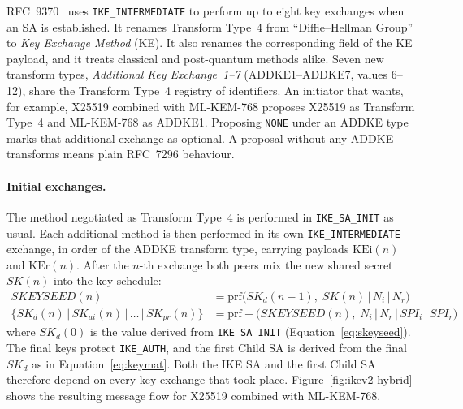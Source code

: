 RFC~9370~\cite{rfc9370} uses \texttt{IKE\_INTERMEDIATE} to perform up to
eight key exchanges when an SA is established. It renames Transform Type~4 from
``Diffie--Hellman Group'' to \emph{Key Exchange Method} (KE). It also renames
the corresponding field of the KE payload, and it treats classical and
post-quantum methods alike. Seven new transform types, \emph{Additional Key
Exchange~1--7} (ADDKE1--ADDKE7, values 6--12), share the Transform Type~4
registry of identifiers. An initiator that wants, for example, X25519 combined
with ML-KEM-768 proposes X25519 as Transform Type~4 and ML-KEM-768 as ADDKE1.
Proposing \texttt{NONE} under an ADDKE type marks that additional exchange as
optional. A proposal without any ADDKE transforms means plain RFC~7296
behaviour.

\paragraph{Initial exchanges.}
The method negotiated as Transform Type~4 is performed in
\texttt{IKE\_SA\_INIT} as usual. Each additional method is then performed in
its own \texttt{IKE\_INTERMEDIATE} exchange, in order of the ADDKE transform
type, carrying payloads $\mathrm{KEi}(n)$ and $\mathrm{KEr}(n)$. After the
$n$-th exchange both peers mix the new shared secret $SK(n)$ into the key
schedule:
\begin{align}
    \mathit{SKEYSEED}(n) &= \mathrm{prf}\bigl(SK_d(n{-}1),\; SK(n) \,|\, N_i \,|\, N_r\bigr) \\
    \{SK_d(n) \,|\, SK_{ai}(n) \,|\, \ldots \,|\, SK_{pr}(n)\}
        &= \mathrm{prf+}\bigl(\mathit{SKEYSEED}(n),\; N_i \,|\, N_r \,|\, SPI_i \,|\, SPI_r\bigr)
\end{align}
where $SK_d(0)$ is the value derived from \texttt{IKE\_SA\_INIT}
(Equation~\eqref{eq:skeyseed}). The final keys protect \texttt{IKE\_AUTH}, and
the first Child SA is derived from the final $SK_d$ as in
Equation~\eqref{eq:keymat}. Both the IKE SA and the first Child SA therefore
depend on every key exchange that took place. Figure~\ref{fig:ikev2-hybrid}
shows the resulting message flow for X25519 combined with ML-KEM-768.

